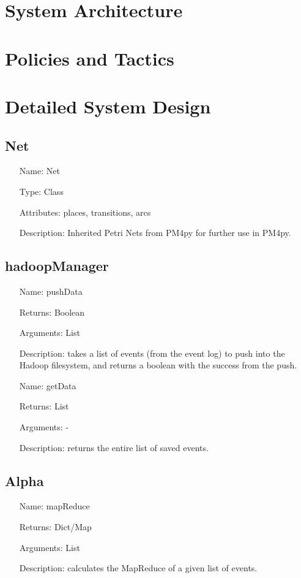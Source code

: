 \documentclass[runningheads]{llncs}
\begin{document}
\section{System Architecture}
\section{Policies and Tactics}
\section{Detailed System Design}
\subsection{Net}
\begin{itemize}
	\item[Name:] Net
	\item[Type:] Class
	\item[Attributes:] places, transitions, arcs
	\item[Description:] Inherited Petri Nets from PM4py for further use in PM4py.
\end{itemize}
\subsection{hadoopManager}
\begin{itemize}
\item[Name:] pushData
\item[Returns:] Boolean
\item[Arguments:] List
\item[Description:] takes a list of events (from the event log) to push into the Hadoop filesystem, and returns a boolean with the success from the push.
\end{itemize}

\begin{itemize}
\item[Name:] getData
\item[Returns:] List
\item[Arguments:] -
\item[Description:] returns the entire list of saved events.
\end{itemize}

\subsection{Alpha}
\begin{itemize}
\item[Name:] mapReduce
\item[Returns:] Dict/Map
\item[Arguments:] List
\item[Description:] calculates the MapReduce of a given list of events.
\end{itemize}
\end{document}
